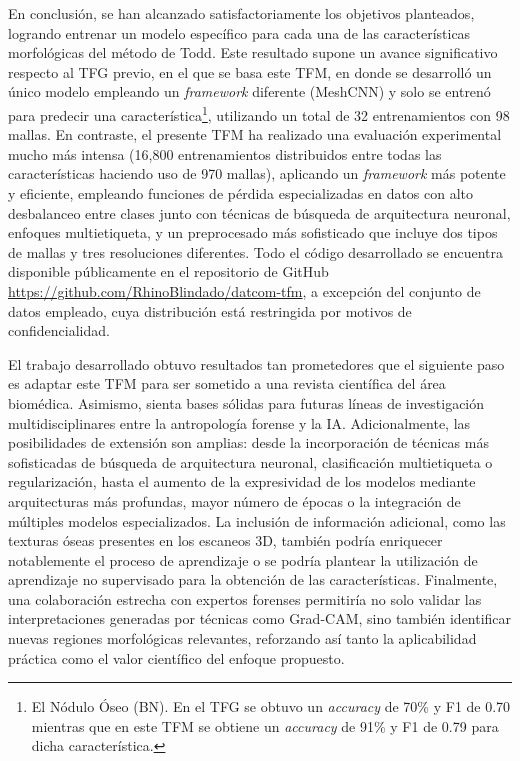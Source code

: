 En conclusión, se han alcanzado satisfactoriamente los objetivos planteados, logrando entrenar un modelo específico para cada una de las características morfológicas del método de Todd. Este resultado supone un avance significativo respecto al TFG previo, en el que se basa este TFM, en donde se desarrolló un único modelo empleando un \textit{framework} diferente (MeshCNN) y solo se entrenó para predecir una característica\footnote{El Nódulo Óseo (BN). En el TFG se obtuvo un \textit{accuracy} de 70\% y F1 de 0.70 mientras que en este TFM se obtiene un \textit{accuracy} de 91\% y F1 de 0.79 para dicha característica.}, utilizando un total de 32 entrenamientos con 98 mallas. En contraste, el presente TFM ha realizado una evaluación experimental mucho más intensa (16,800 entrenamientos distribuidos entre todas las características haciendo uso de 970 mallas), aplicando un \textit{framework} más potente y eficiente, empleando funciones de pérdida especializadas en datos con alto desbalanceo entre clases junto con técnicas de búsqueda de arquitectura neuronal, enfoques multietiqueta, y un preprocesado más sofisticado que incluye dos tipos de mallas y tres resoluciones diferentes. Todo el código desarrollado se encuentra disponible públicamente en el repositorio de GitHub \url{https://github.com/RhinoBlindado/datcom-tfm}, a excepción del conjunto de datos empleado, cuya distribución está restringida por motivos de confidencialidad.

El trabajo desarrollado obtuvo resultados tan prometedores que el siguiente paso es adaptar este TFM para ser sometido a una revista científica del área biomédica. Asimismo, sienta bases sólidas para futuras líneas de investigación multidisciplinares entre la antropología forense y la IA. Adicionalmente, las posibilidades de extensión son amplias: desde la incorporación de técnicas más sofisticadas de búsqueda de arquitectura neuronal, clasificación multietiqueta o regularización, hasta el aumento de la expresividad de los modelos mediante arquitecturas más profundas, mayor número de épocas o la integración de múltiples modelos especializados. La inclusión de información adicional, como las texturas óseas presentes en los escaneos 3D, también podría enriquecer notablemente el proceso de aprendizaje o se podría plantear la utilización de aprendizaje no supervisado para la obtención de las características. Finalmente, una colaboración estrecha con expertos forenses permitiría no solo validar las interpretaciones generadas por técnicas como Grad-CAM, sino también identificar nuevas regiones morfológicas relevantes, reforzando así tanto la aplicabilidad práctica como el valor científico del enfoque propuesto.